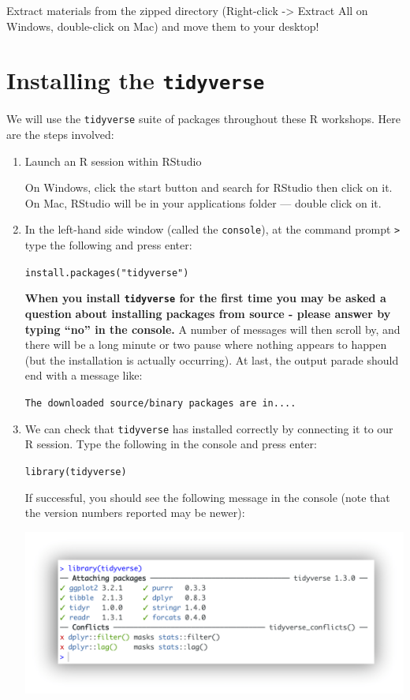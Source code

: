 \documentclass[
]{book}
\begin{document}
Extract materials from the zipped directory (Right-click -\textgreater{} Extract All on Windows, double-click on Mac) and move them to your desktop!

\hypertarget{installing-the-tidyverse}{%
\section{\texorpdfstring{Installing the \texttt{tidyverse}}{Installing the tidyverse}}\label{installing-the-tidyverse}}

We will use the \texttt{tidyverse} suite of packages throughout these R workshops.
Here are the steps involved:

\begin{enumerate}
\def\labelenumi{\arabic{enumi}.}
\item
  Launch an R session within RStudio

  On Windows, click the start button and search for RStudio then click on it. On Mac,
  RStudio will be in your applications folder --- double click on it.
\item
  In the left-hand side window (called the \texttt{console}), at the command prompt \texttt{\textgreater{}} type the following and press enter:

  \texttt{install.packages("tidyverse")}

  \textbf{When you install \texttt{tidyverse} for the first time you may be asked a question}
  \textbf{about installing packages from source - please answer by typing ``no'' in the console.}
  A number of messages will then scroll by, and there will be a long minute or two
  pause where nothing appears to happen (but the installation is actually occurring).
  At last, the output parade should end with a message like:

  \texttt{The\ downloaded\ source/binary\ packages\ are\ in....}
\item
  We can check that \texttt{tidyverse} has installed correctly by connecting it to our R session.
  Type the following in the console and press enter:

  \texttt{library(tidyverse)}

  If successful, you should see the following message in the console (note that the version numbers reported may be newer):

  \includegraphics{R/Rinstall/images/tidyverse_install.png}


\end{enumerate}
\end{document}
